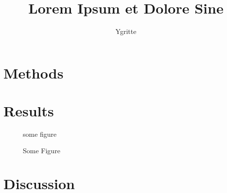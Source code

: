 \documentclass[a4paper]{p-oldpaper}
\author{Ygritte}
\title{Lorem Ipsum et Dolore Sine}
\begin{document}
\begin{multicols}{4}
	\section{Methods}
	\blindtext
	
	\section{Results}
	\blindtext
	
	\begin{figure}[H]
	some figure
	\caption{Some Figure}
	\end{figure}
	
	\blindtext
	
	\blindtext
	
	\section{Discussion}
	\blindtext
	
	\blindtext
	
\end{multicols}
\end{document}
